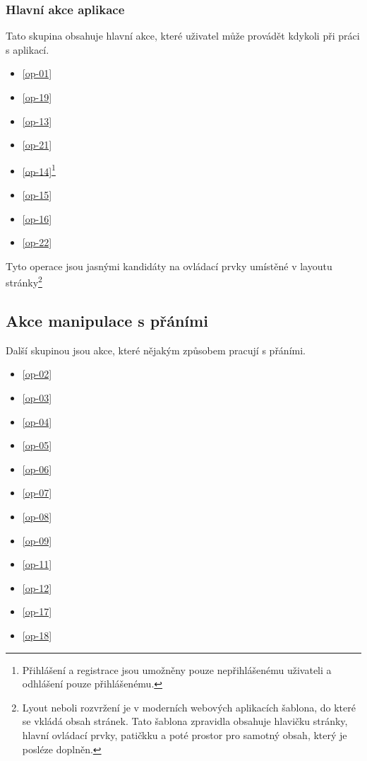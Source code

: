 \subsubsection{Hlavní akce aplikace}
\label{sec:hlavni-akce}
Tato skupina obsahuje hlavní akce, které uživatel může provádět kdykoli při práci s aplikací.
\begin{multicols}{2}
\begin{itemize}
\item \ref{op-01}
\item \ref{op-19}
\item \ref{op-13}
\item \ref{op-21}
\item \ref{op-14}\footnote{Přihlášení a registrace jsou umožněny pouze nepřihlášenému uživateli a odhlášení pouze přihlášenému.\label{footnote-login}}
\item \ref{op-15}
\item \ref{op-16}
\item \ref{op-22}
\end{itemize}
\end{multicols}

Tyto operace jsou jasnými kandidáty na ovládací prvky umístěné v layoutu stránky\footnote{Lyout neboli rozvržení je v moderních webových aplikacích šablona, do které se vkládá obsah stránek. Tato šablona zpravidla obsahuje hlavičku stránky, hlavní ovládací prvky, patičkku a poté prostor pro samotný obsah, který je posléze doplněn.}

\subsection{Akce manipulace s přáními}
Další skupinou jsou akce, které nějakým způsobem pracují s přáními.
\begin{multicols}{2}
\begin{itemize}
\item \ref{op-02}
\item \ref{op-03}
\item \ref{op-04}
\item \ref{op-05}
\item \ref{op-06}
\item \ref{op-07}
\item \ref{op-08}
\item \ref{op-09}
\item \ref{op-11}
\item \ref{op-12}
\item \ref{op-17}
\item \ref{op-18}
\end{itemize}
\end{multicols}

